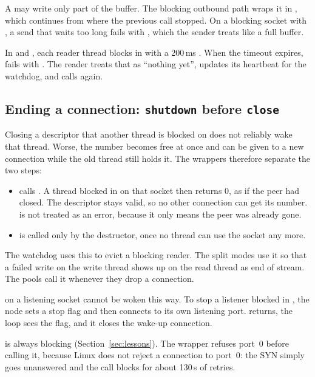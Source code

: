A  may write only part of the buffer. The blocking outbound path wraps it
in , which continues from where the previous call stopped. On a
blocking socket with , a send that waits too long fails with
, which the sender treats like a full buffer.

In  and , each reader thread blocks in
 with a 200\,ms . When the timeout expires,
 fails with . The reader treats that as ``nothing yet'',
updates its heartbeat for the watchdog, and calls  again.

\subsection{Ending a connection: \texttt{shutdown} before \texttt{close}}

Closing a descriptor that another thread is blocked on does not reliably wake that
thread. Worse, the number becomes free at once and can be given to a new connection
while the old thread still holds it. The wrappers therefore separate the two steps:
\begin{itemize}
  \item {} calls . A
        thread blocked in  on that socket then returns 0, as if the peer
        had closed. The descriptor stays valid, so no other connection can get its
        number.  is not treated as an error, because it only means
        the peer was already gone.
  \item {} is called only by the destructor, once no thread can use the
        socket any more.
\end{itemize}
The watchdog uses this to evict a blocking reader. The split modes use it so that a
failed write on the write thread shows up on the read thread as end of stream. The
pools call it whenever they drop a connection.

 on a listening socket cannot be woken this way. To stop a listener
blocked in , the node sets a stop flag and then connects to its own
listening port.  returns, the loop sees the flag, and it closes the
wake-up connection.

 is always blocking (Section~\ref{sec:lessons}). The wrapper refuses
port~0 before calling it, because Linux does not reject a connection to port~0: the
SYN simply goes unanswered and the call blocks for about 130\,s of retries.

